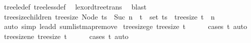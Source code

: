 \begin{isabellebody}
\ tree{\isacharunderscore}{\kern0pt}le{\isacharunderscore}{\kern0pt}def\ tree{\isacharunderscore}{\kern0pt}less{\isacharunderscore}{\kern0pt}def\ \isamarkupfalse%
\ lexord{\isacharunderscore}{\kern0pt}tree{\isacharunderscore}{\kern0pt}trans\ \isamarkupfalse%
\ blast\isanewline
{}\isamarkupfalse%
%
\endisatagproof
{\isafoldproof}%
%
\isadelimproof
\isanewline
%
\endisadelimproof
\isanewline
{}\isamarkupfalse%
\isanewline
\isanewline
{}\isamarkupfalse%
\ tree{\isacharunderscore}{\kern0pt}size{\isacharunderscore}{\kern0pt}children{\isacharcolon}{\kern0pt}\ {\isachardoublequoteopen}tree{\isacharunderscore}{\kern0pt}size\ {\isacharparenleft}{\kern0pt}Node\ ts{\isacharparenright}{\kern0pt}\ {\isacharequal}{\kern0pt}\ Suc\ n\ {\isasymLongrightarrow}\ t\ {\isasymin}\ set\ ts\ {\isasymLongrightarrow}\ tree{\isacharunderscore}{\kern0pt}size\ t\ {\isasymle}\ n{\isachardoublequoteclose}\isanewline
%
\isadelimproof
\ \ %
\endisadelimproof
%
\isatagproof
{}\isamarkupfalse%
\ {\isacharparenleft}{\kern0pt}auto\ simp{\isacharcolon}{\kern0pt}\ le{\isacharunderscore}{\kern0pt}add{}\ sum{\isacharunderscore}{\kern0pt}list{\isacharunderscore}{\kern0pt}map{\isacharunderscore}{\kern0pt}remove{}{\isacharparenright}{\kern0pt}%
\endisatagproof
{\isafoldproof}%
%
\isadelimproof
\isanewline
%
\endisadelimproof
\isanewline
{}\isamarkupfalse%
\ tree{\isacharunderscore}{\kern0pt}size{\isacharunderscore}{\kern0pt}ge{\isacharunderscore}{\kern0pt}{}{\isacharcolon}{\kern0pt}\ {\isachardoublequoteopen}tree{\isacharunderscore}{\kern0pt}size\ t\ {\isasymge}\ {}{\isachardoublequoteclose}\isanewline
%
\isadelimproof
\ \ %
\endisadelimproof
%
\isatagproof
{}\isamarkupfalse%
\ {\isacharparenleft}{\kern0pt}cases\ t{\isacharparenright}{\kern0pt}\ auto%
\endisatagproof
{\isafoldproof}%
%
\isadelimproof
\isanewline
%
\endisadelimproof
\isanewline
{}\isamarkupfalse%
\ tree{\isacharunderscore}{\kern0pt}size{\isacharunderscore}{\kern0pt}ne{\isacharunderscore}{\kern0pt}{}{\isacharcolon}{\kern0pt}\ {\isachardoublequoteopen}tree{\isacharunderscore}{\kern0pt}size\ t\ {\isasymnoteq}\ {}{\isachardoublequoteclose}\isanewline
%
\isadelimproof
\ \ %
\endisadelimproof
%
\isatagproof
{}\isamarkupfalse%
\ {\isacharparenleft}{\kern0pt}cases\ t{\isacharparenright}{\kern0pt}\ auto%
\endisatagproof
{\isafoldproof}%
%
\isadelimproof
\isanewline
%
\endisadelimproof
\isanewline
{}\isamarkupfalse%

\end{isabellebody}
